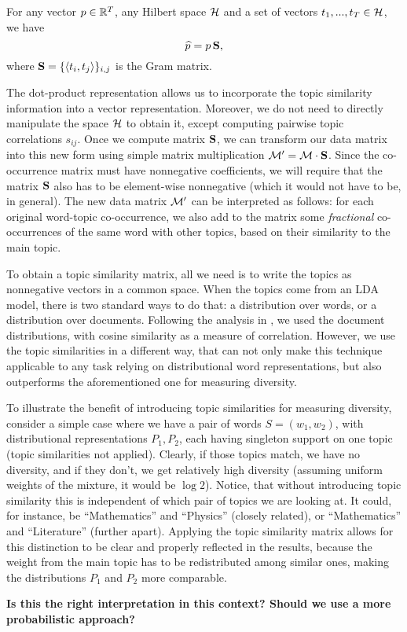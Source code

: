 \ber
For any vector $p\in{\mathbb R}^T$, any Hilbert space ${\mathcal H}$ and a set of
vectors $t_1,...,t_T\in{\mathcal H}$, we have 
\[\widehat{p} = p\operatorname{\mathbf{S}},\]
where $\operatorname{\mathbf{S}}=\{\langle t_i,t_j\rangle\}_{i,j}$ is the Gram matrix.
\eer

The dot-product representation allows us to incorporate the topic
similarity information into a vector representation. Moreover, we do
not need to directly manipulate the space ${\mathcal H}$ to obtain it, except
computing pairwise topic correlations $s_{ij}$. Once we compute matrix
$\operatorname{\mathbf{S}}$, we can transform our data matrix into this new form using simple
matrix multiplication ${\mathcal M}'={\mathcal M}\cdot \operatorname{\mathbf{S}}$. Since the co-occurrence matrix
must have nonnegative coefficients, we will require that the matrix
$\operatorname{\mathbf{S}}$ also has to be element-wise nonnegative (which it would not
have to be, in general). The new data matrix ${\mathcal M}'$ can be interpreted
as follows: for each original word-topic co-occurrence, we also add to
the matrix some {\em fractional} co-occurrences of the same word with
other topics, based on their similarity to the main topic.

To obtain a topic similarity matrix, all we need is to write
the topics as nonnegative vectors in a common space. When the topics
come from an LDA model, there is two standard ways to do that: a
distribution over words, or a distribution over documents. Following
the analysis in \cite{bache:2013}, we used the document distributions,
with cosine similarity as a measure of correlation. However, we use the
topic similarities in a different way, that can not only make this
technique applicable to any task relying on distributional word
representations, but also outperforms the aforementioned one for
measuring diversity.

To illustrate the benefit of introducing topic similarities for
measuring diversity, consider a simple case where we have a pair of words
$S=(w_1,w_2)$, with distributional representations $P_1,P_2$, each having
singleton support on one topic (topic similarities not
applied). Clearly, if those topics match, we 
have no diversity, and if they don't, we get relatively high diversity
(assuming uniform weights of the mixture, it would be $\log 2$). Notice, that without introducing topic similarity this is
independent of which pair of topics we are looking at. It could, for
instance, be ``Mathematics'' and ``Physics'' (closely related), or
``Mathematics'' and ``Literature'' (further apart).  Applying the
topic similarity matrix allows for this distinction to be clear and properly
reflected in the results, because the weight from the main topic has
to be redistributed among similar ones, making the distributions $P_1$
and $P_2$ more comparable.

{\bf Is this the right interpretation in this context? Should we use a
  more probabilistic approach? }

